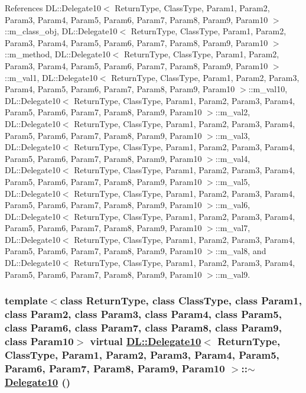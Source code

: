 References DL::Delegate10$<$ Return\-Type, Class\-Type, Param1, Param2, Param3, Param4, Param5, Param6, Param7, Param8, Param9, Param10 $>$::m\_\-class\_\-obj, DL::Delegate10$<$ Return\-Type, Class\-Type, Param1, Param2, Param3, Param4, Param5, Param6, Param7, Param8, Param9, Param10 $>$::m\_\-method, DL::Delegate10$<$ Return\-Type, Class\-Type, Param1, Param2, Param3, Param4, Param5, Param6, Param7, Param8, Param9, Param10 $>$::m\_\-val1, DL::Delegate10$<$ Return\-Type, Class\-Type, Param1, Param2, Param3, Param4, Param5, Param6, Param7, Param8, Param9, Param10 $>$::m\_\-val10, DL::Delegate10$<$ Return\-Type, Class\-Type, Param1, Param2, Param3, Param4, Param5, Param6, Param7, Param8, Param9, Param10 $>$::m\_\-val2, DL::Delegate10$<$ Return\-Type, Class\-Type, Param1, Param2, Param3, Param4, Param5, Param6, Param7, Param8, Param9, Param10 $>$::m\_\-val3, DL::Delegate10$<$ Return\-Type, Class\-Type, Param1, Param2, Param3, Param4, Param5, Param6, Param7, Param8, Param9, Param10 $>$::m\_\-val4, DL::Delegate10$<$ Return\-Type, Class\-Type, Param1, Param2, Param3, Param4, Param5, Param6, Param7, Param8, Param9, Param10 $>$::m\_\-val5, DL::Delegate10$<$ Return\-Type, Class\-Type, Param1, Param2, Param3, Param4, Param5, Param6, Param7, Param8, Param9, Param10 $>$::m\_\-val6, DL::Delegate10$<$ Return\-Type, Class\-Type, Param1, Param2, Param3, Param4, Param5, Param6, Param7, Param8, Param9, Param10 $>$::m\_\-val7, DL::Delegate10$<$ Return\-Type, Class\-Type, Param1, Param2, Param3, Param4, Param5, Param6, Param7, Param8, Param9, Param10 $>$::m\_\-val8, and DL::Delegate10$<$ Return\-Type, Class\-Type, Param1, Param2, Param3, Param4, Param5, Param6, Param7, Param8, Param9, Param10 $>$::m\_\-val9.\hypertarget{classDL_1_1Delegate10_a1}{
\subsubsection[$\sim$Delegate10]{\setlength{\rightskip}{0pt plus 5cm}template$<$class Return\-Type, class Class\-Type, class Param1, class Param2, class Param3, class Param4, class Param5, class Param6, class Param7, class Param8, class Param9, class Param10$>$ virtual \hyperlink{classDL_1_1Delegate10}{DL::Delegate10}$<$ Return\-Type, Class\-Type, Param1, Param2, Param3, Param4, Param5, Param6, Param7, Param8, Param9, Param10 $>$::$\sim$\hyperlink{classDL_1_1Delegate10}{Delegate10} ()}}
\label{classDL_1_1Delegate10_a1}




